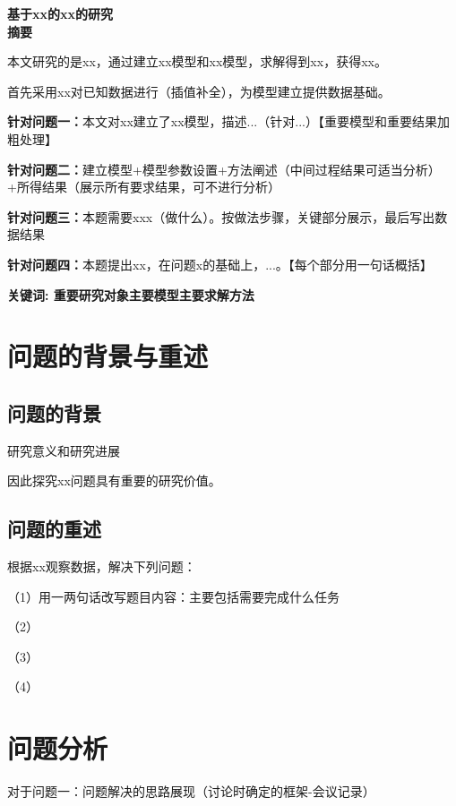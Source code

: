 \documentclass{ctexart}
\begin{document}
\begin{spacing}{2.0}
    \begin{center}
        {\LARGE\textbf{基于xx的xx的研究}}\\
        {\Large\textbf{摘要}}\\
    \end{center}
\end{spacing}

本文研究的是xx，通过建立xx模型和xx模型，求解得到xx，获得xx。

首先采用xx对已知数据进行（插值补全），为模型建立提供数据基础。

\textbf{针对问题一：}\quad 本文对xx建立了xx模型，描述...（针对...）【重要模型和重要结果加粗处理】

\textbf{针对问题二：}\quad 建立模型+模型参数设置+方法阐述（中间过程结果可适当分析）+所得结果（展示所有要求结果，可不进行分析）

\textbf{针对问题三：}\quad 本题需要xxx（做什么）。按做法步骤，关键部分展示，最后写出数据结果

\textbf{针对问题四：}\quad 本题提出xx，在问题x的基础上，...。【每个部分用一句话概括】


\quad

\textbf{关键词: \quad 重要研究对象\quad 主要模型\quad 主要求解方法 }

\newpage
\section{问题的背景与重述}
\subsection{问题的背景}
研究意义和研究进展

因此探究xx问题具有重要的研究价值。

\subsection{问题的重述}

根据xx观察数据，解决下列问题：

（1）用一两句话改写题目内容：主要包括需要完成什么任务

（2）

（3）

（4）

\section{问题分析}
对于问题一：问题解决的思路展现（讨论时确定的框架-会议记录）
\end{document}
